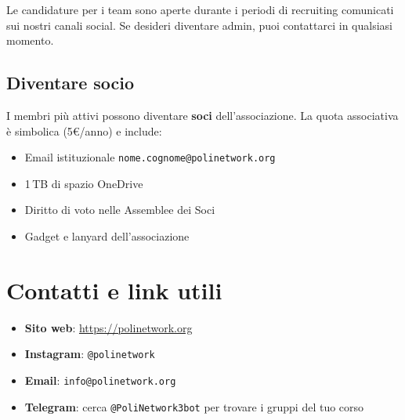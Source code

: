 \documentclass[report]{core/polinetwork}
\begin{document}
Le candidature per i team sono aperte durante i periodi di
recruiting comunicati sui nostri canali social. Se desideri
diventare admin, puoi contattarci in qualsiasi momento.

\subsection{Diventare socio}

I membri più attivi possono diventare \textbf{soci} dell'associazione.
La quota associativa è simbolica (5€/anno) e include:

\begin{itemize}
  \item Email istituzionale \texttt{nome.cognome@polinetwork.org}
  \item 1\,TB di spazio OneDrive
  \item Diritto di voto nelle Assemblee dei Soci
  \item Gadget e lanyard dell'associazione
\end{itemize}

\section{Contatti e link utili}

\begin{itemize}
  \item \textbf{Sito web}: \url{https://polinetwork.org}
  \item \textbf{Instagram}: \texttt{@polinetwork}
  \item \textbf{Email}: \texttt{info@polinetwork.org}
  \item \textbf{Telegram}: cerca \texttt{@PoliNetwork3bot} per
    trovare i gruppi del tuo corso
\end{itemize}


\vfill
\pnContactBlock
\end{document}
